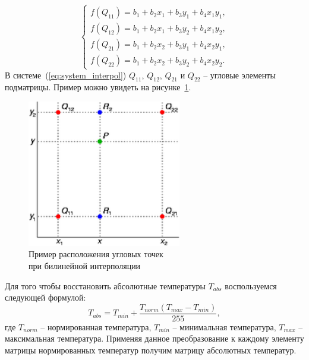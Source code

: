 \documentclass[14pt, a4paper]{extreport}
\begin{document}
	\begin{equation}
		\begin{cases}
			f(Q_{11})=b_{1}+b_{2} x_{1}+b_{3} y_{1}+b_{4} x_{1} y_{1}, \\
			f(Q_{12})=b_{1}+b_{2} x_{1}+b_{3} y_{2}+b_{4} x_{1} y_{2}, \\
			f(Q_{21})=b_{1}+b_{2} x_{2}+b_{3} y_{1}+b_{4} x_{2} y_{1}, \\
			f(Q_{22})=b_{1}+b_{2} x_{2}+b_{3} y_{2}+b_{4} x_{2} y_{2}.
		\end{cases}
		\label{eq:system_interpol}
	\end{equation}
	В системе~(\ref{eq:system_interpol}) $Q_{11}$, $Q_{12}$, $Q_{21}$ и $Q_{22}$ -- угловые элементы подматрицы. Пример можно увидеть на рисунке~\ref{fig:Bilinear_interpolation}.
	\begin{figure}[h!]
		\centering
		\includegraphics[width = 0.6\textwidth]{image/chapter_2/Bilinear_interpolation}	
		\caption{Пример расположения угловых точек \\при билинейной интерполяции}
		\label{fig:Bilinear_interpolation}
	\end{figure}
	Для того чтобы восстановить абсолютные температуры $T_{abs}$ воспользуемся следующей формулой:
	\begin{equation*}
		T_{abs} = T_{min} + \frac{T_{norm}(T_{max} - T_{min})}{255},
		\label{eq:T_abs}
	\end{equation*}
	где $T_{norm}$ -- нормированная температура, $T_{min}$ -- минимальная температура, $T_{max}$ -- максимальная температура. Применяя данное преобразование к каждому элементу матрицы нормированных температур получим матрицу абсолютных температур.
	
\end{document}
